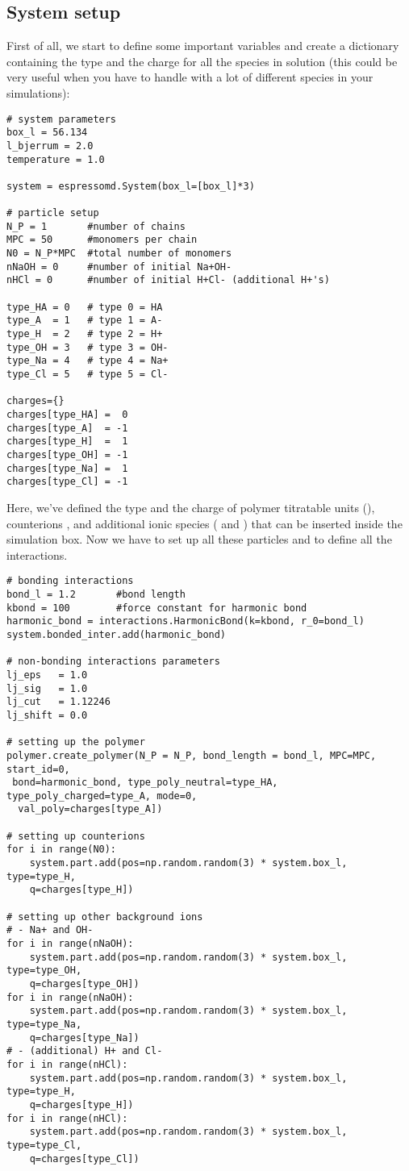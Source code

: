 \documentclass[
a4paper,                        %
11pt,                           %
twoside,                        %
footsepline,                    %
headsepline,                    %
headexclude,                    %
footexclude,                    %
pagesize,                       %
]{scrartcl}
\begin{document}
\subsection{System setup}

First of all, we start to define some important variables and create a dictionary containing the type and the charge for all the species in solution (this could be very useful when you have to handle with a lot of different species in your simulations):
\begin{verbatim}
# system parameters
box_l = 56.134
l_bjerrum = 2.0 
temperature = 1.0

system = espressomd.System(box_l=[box_l]*3)

# particle setup
N_P = 1       #number of chains
MPC = 50      #monomers per chain
N0 = N_P*MPC  #total number of monomers
nNaOH = 0     #number of initial Na+OH-
nHCl = 0      #number of initial H+Cl- (additional H+'s)

type_HA = 0   # type 0 = HA
type_A  = 1   # type 1 = A-
type_H  = 2   # type 2 = H+
type_OH = 3   # type 3 = OH-
type_Na = 4   # type 4 = Na+
type_Cl = 5   # type 5 = Cl-

charges={}
charges[type_HA] =  0    
charges[type_A]  = -1     
charges[type_H]  =  1
charges[type_OH] = -1
charges[type_Na] =  1
charges[type_Cl] = -1 
\end{verbatim}
Here, we've defined the type and the charge of polymer titratable units (), counterions , and additional ionic species ( and ) that can be inserted inside the simulation box. Now we have to set up all these particles and to define all the interactions.
\begin{verbatim}
# bonding interactions
bond_l = 1.2       #bond length
kbond = 100        #force constant for harmonic bond
harmonic_bond = interactions.HarmonicBond(k=kbond, r_0=bond_l)
system.bonded_inter.add(harmonic_bond)

# non-bonding interactions parameters
lj_eps   = 1.0
lj_sig   = 1.0
lj_cut   = 1.12246
lj_shift = 0.0

# setting up the polymer
polymer.create_polymer(N_P = N_P, bond_length = bond_l, MPC=MPC, start_id=0,
 bond=harmonic_bond, type_poly_neutral=type_HA, type_poly_charged=type_A, mode=0,
  val_poly=charges[type_A])
  
# setting up counterions
for i in range(N0):
    system.part.add(pos=np.random.random(3) * system.box_l, type=type_H, 
    q=charges[type_H])

# setting up other background ions
# - Na+ and OH-
for i in range(nNaOH):
    system.part.add(pos=np.random.random(3) * system.box_l, type=type_OH,
    q=charges[type_OH])
for i in range(nNaOH):
    system.part.add(pos=np.random.random(3) * system.box_l, type=type_Na,
    q=charges[type_Na])
# - (additional) H+ and Cl-
for i in range(nHCl):
    system.part.add(pos=np.random.random(3) * system.box_l, type=type_H, 
    q=charges[type_H])
for i in range(nHCl):
    system.part.add(pos=np.random.random(3) * system.box_l, type=type_Cl, 
    q=charges[type_Cl])
\end{verbatim}
\end{document}
